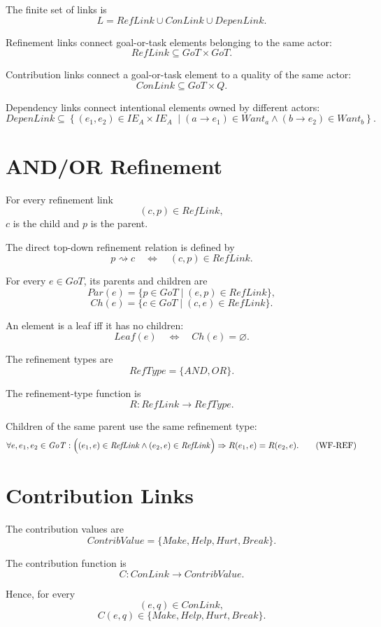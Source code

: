 \documentclass[11pt,a4paper]{article}
\newcommand{\IEA}{\mathit{IE}_{A}}
\newcommand{\GoT}{\mathit{GoT}}
\newcommand{\RefLink}{\mathit{RefLink}}
\newcommand{\ConLink}{\mathit{ConLink}}
\newcommand{\DepenLink}{\mathit{DepenLink}}
\newcommand{\RefType}{\mathit{RefType}}
\newcommand{\ContribValue}{\mathit{ContribValue}}
\newcommand{\Par}{\mathit{Par}}
\newcommand{\Ch}{\mathit{Ch}}
\newcommand{\Leaf}{\mathit{Leaf}}
\begin{document}
The finite set of links is
\[
L
=
\RefLink
\cup
\ConLink
\cup
\DepenLink.
\]

Refinement links connect goal-or-task elements belonging to the same actor:
\[
\RefLink
\subseteq
\GoT\times\GoT.
\]

Contribution links connect a goal-or-task element to a quality of the same actor:
\[
\ConLink
\subseteq
\GoT\times Q.
\]

Dependency links connect intentional elements owned by different actors:
\[
\DepenLink
\subseteq
\left\{
(e_1,e_2)\in\IEA\times\IEA
\;\middle|
(a \to e_1 )\in Want_a
\land
(b \to e_2)\in Want_b
\right\}.
\]

\section{AND/OR Refinement}

For every refinement link
\[
(c,p)\in\RefLink,
\]
\(c\) is the child and \(p\) is the parent.

The direct top-down refinement relation is defined by
\[
p \rightsquigarrow c
\quad\Longleftrightarrow\quad
(c,p)\in\RefLink.
\]

For every \(e\in\GoT\), its parents and children are
\[
\Par(e)
=
\{
p\in\GoT
\mid
(e,p)\in\RefLink
\},
\]
\[
\Ch(e)
=
\{
c\in\GoT
\mid
(c,e)\in\RefLink
\}.
\]

An element is a leaf iff it has no children:
\[
\Leaf(e)
\quad\Longleftrightarrow\quad
\Ch(e)=\varnothing.
\]

The refinement types are
\[
\RefType
=
\{
\mathit{AND},
\mathit{OR}
\}.
\]

The refinement-type function is
\[
R
:
\RefLink
\rightarrow
\RefType.
\]

Children of the same parent use the same refinement type:
\[
\forall e,e_1,e_2\in\GoT:
\Bigl(
(e_1,e)\in\RefLink
\land
(e_2,e)\in\RefLink
\Bigr)
\Rightarrow
R(e_1,e)=R(e_2,e).
\tag{WF-REF}
\]



\section{Contribution Links}

The contribution values are
\[
\ContribValue
=
\{
\mathit{Make},
\mathit{Help},
\mathit{Hurt},
\mathit{Break}
\}.
\]

The contribution function is
\[
C
:
\ConLink
\rightarrow
\ContribValue.
\]

Hence, for every
\[
(e,q)\in\ConLink,
\]
\[
C(e,q)
\in
\{
\mathit{Make},
\mathit{Help},
\mathit{Hurt},
\mathit{Break}
\}.
\]
\end{document}
